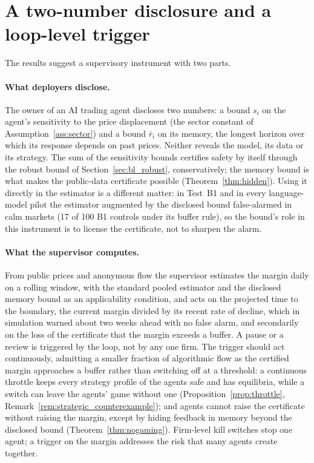 \section{A two-number disclosure and a loop-level trigger}\label{sec:ai_policy}

The results suggest a supervisory instrument with two parts.

\paragraph{What deployers disclose.} The owner of an AI trading agent discloses two numbers: a bound $s_i$ on the agent's sensitivity to the price displacement (the sector constant of Assumption~\ref{ass:sector}) and a bound $\bar r_i$ on its memory, the longest horizon over which its response depends on past prices. Neither reveals the model, its data or its strategy. The sum of the sensitivity bounds certifies safety by itself through the robust bound of Section~\ref{sec:bl_robust}, conservatively; the memory bound is what makes the public-data certificate possible (Theorem~\ref{thm:hidden}). Using it directly in the estimator is a different matter: in Test~B1 and in every language-model pilot the estimator augmented by the disclosed bound false-alarmed in calm markets (17 of 100 B1 controls under its buffer rule), so the bound's role in this instrument is to license the certificate, not to sharpen the alarm.

\paragraph{What the supervisor computes.} From public prices and anonymous flow the supervisor estimates the margin daily on a rolling window, with the standard pooled estimator and the disclosed memory bound as an applicability condition, and acts on the projected time to the boundary, the current margin divided by its recent rate of decline, which in simulation warned about two weeks ahead with no false alarm, and secondarily on the loss of the certificate that the margin exceeds a buffer. A pause or a review is triggered by the loop, not by any one firm. The trigger should act continuously, admitting a smaller fraction of algorithmic flow as the certified margin approaches a buffer rather than switching off at a threshold: a continuous throttle keeps every strategy profile of the agents safe and has equilibria, while a switch can leave the agents' game without one (Proposition~\ref{prop:throttle}, Remark~\ref{rem:strategic_counterexample}); and agents cannot raise the certificate without raising the margin, except by hiding feedback in memory beyond the disclosed bound (Theorem~\ref{thm:nogaming}). Firm-level kill switches stop one agent; a trigger on the margin addresses the risk that many agents create together.

